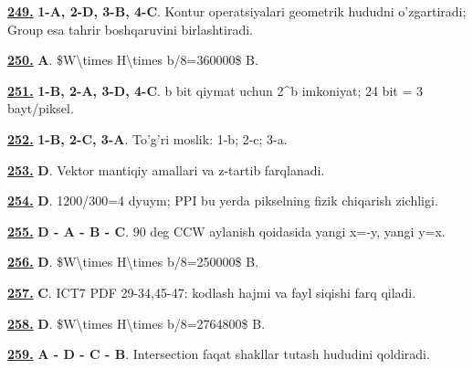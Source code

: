 \documentclass[10pt,a4paper,oneside]{article}
\begin{document}
\noindent\hyperlink{q249}{\textbf{249.}} \textbf{1-A, 2-D, 3-B, 4-C}.  Kontur operatsiyalari geometrik hududni o'zgartiradi; Group esa tahrir boshqaruvini birlashtiradi.
\par\vspace{3mm}
\noindent\hyperlink{q250}{\textbf{250.}} \textbf{A}.  \$W\textbackslash{}times H\textbackslash{}times b/8=360000\$ B.
\par\vspace{3mm}
\noindent\hyperlink{q251}{\textbf{251.}} \textbf{1-B, 2-A, 3-D, 4-C}.  b bit qiymat uchun 2\textasciicircum{}b imkoniyat; 24 bit = 3 bayt/piksel.
\par\vspace{3mm}
\noindent\hyperlink{q252}{\textbf{252.}} \textbf{1-B, 2-C, 3-A}.  To'g'ri moslik: 1-b; 2-c; 3-a.
\par\vspace{3mm}
\noindent\hyperlink{q253}{\textbf{253.}} \textbf{D}.  Vektor mantiqiy amallari va z-tartib farqlanadi.
\par\vspace{3mm}
\noindent\hyperlink{q254}{\textbf{254.}} \textbf{D}.  1200/300=4 dyuym; PPI bu yerda pikselning fizik chiqarish zichligi.
\par\vspace{3mm}
\noindent\hyperlink{q255}{\textbf{255.}} \textbf{D - A - B - C}.  90 deg  CCW aylanish qoidasida yangi x=-y, yangi y=x.
\par\vspace{3mm}
\noindent\hyperlink{q256}{\textbf{256.}} \textbf{D}.  \$W\textbackslash{}times H\textbackslash{}times b/8=250000\$ B.
\par\vspace{3mm}
\noindent\hyperlink{q257}{\textbf{257.}} \textbf{C}.  ICT7 PDF 29-34,45-47: kodlash hajmi va fayl siqishi farq qiladi.
\par\vspace{3mm}
\noindent\hyperlink{q258}{\textbf{258.}} \textbf{D}.  \$W\textbackslash{}times H\textbackslash{}times b/8=2764800\$ B.
\par\vspace{3mm}
\noindent\hyperlink{q259}{\textbf{259.}} \textbf{A - D - C - B}.  Intersection faqat shakllar tutash hududini qoldiradi.
\end{document}
